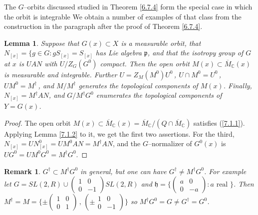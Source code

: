 \documentclass{conm-p-l}
\newtheorem{lemma}[equation]{Lemma}
\newtheorem{remark}[equation]{Remark}
\newcommand{\gp}{\mathfrak{p}}
\def\gh{\mathfrak{h}}
\def\gp{\mathfrak{p}}
\def\C{\mathbb{C}}
\begin{document}
The $G$--orbits discussed studied in Theorem \ref{6.7.4} 
form the special case in which the orbit is integrable  We obtain a 
number of examples of that class from the construction in the paragraph
after the proof of Theorem \ref{6.7.4}.

\begin{lemma}\label{8.1.3}
Suppose that $G(x) \subset X$ is a measurable orbit, that
$N_{[x]} = \{g \in G : gS_{[x]} = S_{[x]}$ has Lie algebra $\gp$, and 
that the isotropy group of $G$ at $x$ is $UAN$ with $U/Z_G(G^0)$
compact. 
Then the open orbit $M(x) \subset \overline{M}_\C(x)$ is measurable and
integrable.  Further $U = Z_M(M^0)U^0$\,, $U \cap M^0 = U^0$\,,
$UM^0 = M^\dagger$\,, and $M/M^\dagger$ generates the topological
components of $M(x)$.  Finally, $N_{[x]} = M^\dagger AN$, and $G/M^\dagger G^0$
enumerates the topological components of $Y = G(x)$.
\end{lemma}

\begin{proof}
The open orbit $M(x) \subset \overline{M}_\C(x) =
\overline{M}_\C/(Q \cap \overline{M}_\C)$ satisfies (\ref{7.1.1}).  Applying
Lemma \ref{7.1.2} to it, we get the first two assertions.  For the third,
$N_{[x]} = UN_{[x]}^0 = UM^0 AN = M^\dagger AN$, and the $G$--normalizer
of $G^0(x)$ is $UG^0 = UM^0G^0 = M^\dagger G^0$. 
\end{proof}

\begin{remark}\label{8.1.3x}{\rm
$G^\dagger \subset M^\dagger G^0$ in general, but one
can have $G^\dagger \ne M^\dagger G^0$.  For example let $G = SL(2,R) 
\cup \left ( \begin{smallmatrix} 1 & 0 \\ 0 & -1 \end{smallmatrix}
\right ) SL(2,R)$ and $\gh = \{ \left ( \begin{smallmatrix} a & 0 \\ 
0 & -a \end{smallmatrix} \right ) : a \text{ real }\}$.  Then
$M^\dagger = M = \{\pm \left ( \begin{smallmatrix}1 & 0 \\ 0 & 1 
\end{smallmatrix}\right )\,,\, \left ( \pm \begin{smallmatrix}1 & 0 \\ 0 & -1 
\end{smallmatrix} \right ) \}$ so $M^\dagger G^0 = G \ne G^\dagger = G^0$.}
\end{remark}
\end{document}
